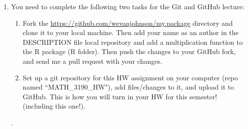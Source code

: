 \documentclass[11pt]{article}
\begin{document}
\begin{enumerate}
	
	\item You need to complete the following two tasks for the Git and GitHub lecture: 
	\begin{enumerate}
		\item Fork the \href{https://github.com/wevanjohnson/my.package}{https://github.com/wevanjohnson/my.package} directory and clone it to your local machine. Then add your name as an author in the DESCRIPTION file local repository and add a multiplication function to the R package (R folder). Then push the changes to your GitHub fork, and send me a pull request with your changes.  
		\item Set up a git repository for this HW assignment on your computer (repo named ``MATH\_3190\_HW"), add files/changes to it, and upload it to GitHub. This is how you will turn in your HW for this semester! (including this one!). 
	\end{enumerate}. 

\end{enumerate}
\end{document}
